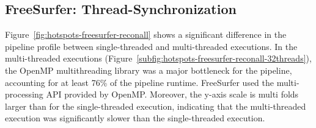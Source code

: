\documentclass[conference]{IEEEtran}
\begin{document}
\subsection{FreeSurfer: Thread-Synchronization}
Figure~\ref{fig:hotspots-freesurfer-reconall} shows a significant difference in the pipeline profile between single-threaded and multi-threaded executions. In the multi-threaded executions (Figure~\ref{subfig:hotspots-freesurfer-reconall-32threads}), the OpenMP multithreading library was a major bottleneck for the pipeline, accounting for at least 76\% of the pipeline runtime. FreeSurfer used the multi-processing API provided by OpenMP. Moreover, the y-axis scale is multi folds larger than for the single-threaded execution, indicating that the multi-threaded execution was significantly slower than the single-threaded execution.
					
\end{document}
